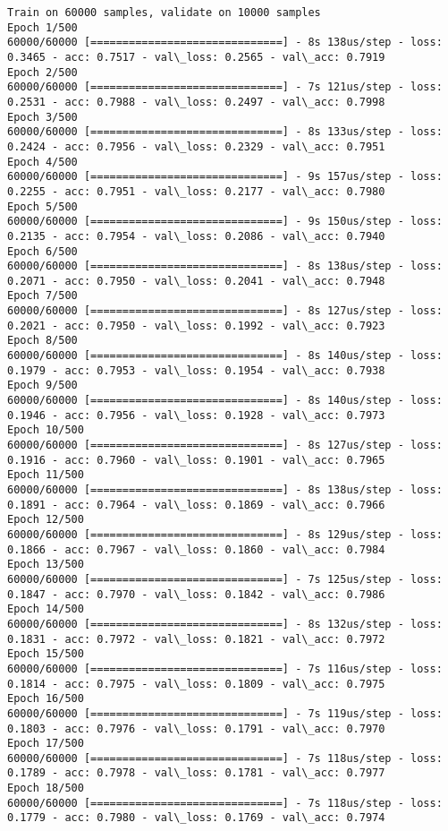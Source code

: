 \documentclass[11pt]{article}
\begin{document}
    \begin{Verbatim}[commandchars=\\\{\}]
Train on 60000 samples, validate on 10000 samples
Epoch 1/500
60000/60000 [==============================] - 8s 138us/step - loss: 0.3465 - acc: 0.7517 - val\_loss: 0.2565 - val\_acc: 0.7919
Epoch 2/500
60000/60000 [==============================] - 7s 121us/step - loss: 0.2531 - acc: 0.7988 - val\_loss: 0.2497 - val\_acc: 0.7998
Epoch 3/500
60000/60000 [==============================] - 8s 133us/step - loss: 0.2424 - acc: 0.7956 - val\_loss: 0.2329 - val\_acc: 0.7951
Epoch 4/500
60000/60000 [==============================] - 9s 157us/step - loss: 0.2255 - acc: 0.7951 - val\_loss: 0.2177 - val\_acc: 0.7980
Epoch 5/500
60000/60000 [==============================] - 9s 150us/step - loss: 0.2135 - acc: 0.7954 - val\_loss: 0.2086 - val\_acc: 0.7940
Epoch 6/500
60000/60000 [==============================] - 8s 138us/step - loss: 0.2071 - acc: 0.7950 - val\_loss: 0.2041 - val\_acc: 0.7948
Epoch 7/500
60000/60000 [==============================] - 8s 127us/step - loss: 0.2021 - acc: 0.7950 - val\_loss: 0.1992 - val\_acc: 0.7923
Epoch 8/500
60000/60000 [==============================] - 8s 140us/step - loss: 0.1979 - acc: 0.7953 - val\_loss: 0.1954 - val\_acc: 0.7938
Epoch 9/500
60000/60000 [==============================] - 8s 140us/step - loss: 0.1946 - acc: 0.7956 - val\_loss: 0.1928 - val\_acc: 0.7973
Epoch 10/500
60000/60000 [==============================] - 8s 127us/step - loss: 0.1916 - acc: 0.7960 - val\_loss: 0.1901 - val\_acc: 0.7965
Epoch 11/500
60000/60000 [==============================] - 8s 138us/step - loss: 0.1891 - acc: 0.7964 - val\_loss: 0.1869 - val\_acc: 0.7966
Epoch 12/500
60000/60000 [==============================] - 8s 129us/step - loss: 0.1866 - acc: 0.7967 - val\_loss: 0.1860 - val\_acc: 0.7984
Epoch 13/500
60000/60000 [==============================] - 7s 125us/step - loss: 0.1847 - acc: 0.7970 - val\_loss: 0.1842 - val\_acc: 0.7986
Epoch 14/500
60000/60000 [==============================] - 8s 132us/step - loss: 0.1831 - acc: 0.7972 - val\_loss: 0.1821 - val\_acc: 0.7972
Epoch 15/500
60000/60000 [==============================] - 7s 116us/step - loss: 0.1814 - acc: 0.7975 - val\_loss: 0.1809 - val\_acc: 0.7975
Epoch 16/500
60000/60000 [==============================] - 7s 119us/step - loss: 0.1803 - acc: 0.7976 - val\_loss: 0.1791 - val\_acc: 0.7970
Epoch 17/500
60000/60000 [==============================] - 7s 118us/step - loss: 0.1789 - acc: 0.7978 - val\_loss: 0.1781 - val\_acc: 0.7977
Epoch 18/500
60000/60000 [==============================] - 7s 118us/step - loss: 0.1779 - acc: 0.7980 - val\_loss: 0.1769 - val\_acc: 0.7974

\end{Verbatim}
\end{document}
